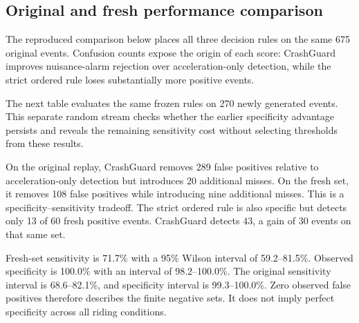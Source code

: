 \documentclass[10pt,a4paper]{article}
\begin{document}
\subsection{Original and fresh performance comparison}
The reproduced comparison below places all three decision rules on the same 675 original events. Confusion counts expose the origin of each score: CrashGuard improves nuisance-alarm rejection over acceleration-only detection, while the strict ordered rule loses substantially more positive events.

\begin{table}[H]\centering\small\caption{Reproduced 675-event comparison. Acc., sensitivity (Sens.), and specificity (Spec.) are percentages.}
\end{table}
The next table evaluates the same frozen rules on 270 newly generated events. This separate random stream checks whether the earlier specificity advantage persists and reveals the remaining sensitivity cost without selecting thresholds from these results.

\begin{table}[H]\centering\small\caption{Fresh 270-event test with unchanged detector settings.}
\resizebox{\linewidth}{!}{}\end{table}
On the original replay, CrashGuard removes 289 false positives relative to acceleration-only detection but introduces 20 additional misses. On the fresh set, it removes 108 false positives while introducing nine additional misses. This is a specificity--sensitivity tradeoff. The strict ordered rule is also specific but detects only 13 of 60 fresh positive events. CrashGuard detects 43, a gain of 30 events on that same set.

Fresh-set sensitivity is 71.7\% with a 95\% Wilson interval of 59.2--81.5\%. Observed specificity is 100.0\% with an interval of 98.2--100.0\%. The original sensitivity interval is 68.6--82.1\%, and specificity interval is 99.3--100.0\%. Zero observed false positives therefore describes the finite negative sets. It does not imply perfect specificity across all riding conditions.
\end{document}
